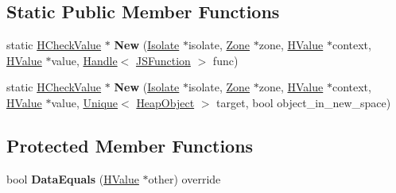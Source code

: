 \subsection*{Static Public Member Functions}
\begin{DoxyCompactItemize}
\item 
static \hyperlink{classv8_1_1internal_1_1_h_check_value}{H\+Check\+Value} $\ast$ {\bfseries New} (\hyperlink{classv8_1_1internal_1_1_isolate}{Isolate} $\ast$isolate, \hyperlink{classv8_1_1internal_1_1_zone}{Zone} $\ast$zone, \hyperlink{classv8_1_1internal_1_1_h_value}{H\+Value} $\ast$context, \hyperlink{classv8_1_1internal_1_1_h_value}{H\+Value} $\ast$value, \hyperlink{classv8_1_1internal_1_1_handle}{Handle}$<$ \hyperlink{classv8_1_1internal_1_1_j_s_function}{J\+S\+Function} $>$ func)\hypertarget{classv8_1_1internal_1_1_h_check_value_a55239b82d59f2dee806c773e62ea68b3}{}\label{classv8_1_1internal_1_1_h_check_value_a55239b82d59f2dee806c773e62ea68b3}

\item 
static \hyperlink{classv8_1_1internal_1_1_h_check_value}{H\+Check\+Value} $\ast$ {\bfseries New} (\hyperlink{classv8_1_1internal_1_1_isolate}{Isolate} $\ast$isolate, \hyperlink{classv8_1_1internal_1_1_zone}{Zone} $\ast$zone, \hyperlink{classv8_1_1internal_1_1_h_value}{H\+Value} $\ast$context, \hyperlink{classv8_1_1internal_1_1_h_value}{H\+Value} $\ast$value, \hyperlink{classv8_1_1internal_1_1_unique}{Unique}$<$ \hyperlink{classv8_1_1internal_1_1_heap_object}{Heap\+Object} $>$ target, bool object\+\_\+in\+\_\+new\+\_\+space)\hypertarget{classv8_1_1internal_1_1_h_check_value_a7dbd577190e36b21ffe65d6d009ef89d}{}\label{classv8_1_1internal_1_1_h_check_value_a7dbd577190e36b21ffe65d6d009ef89d}

\end{DoxyCompactItemize}
\subsection*{Protected Member Functions}
\begin{DoxyCompactItemize}
\item 
bool {\bfseries Data\+Equals} (\hyperlink{classv8_1_1internal_1_1_h_value}{H\+Value} $\ast$other) override\hypertarget{classv8_1_1internal_1_1_h_check_value_a8c11a7d9c45bad87d42589cb02a3b5d2}{}\label{classv8_1_1internal_1_1_h_check_value_a8c11a7d9c45bad87d42589cb02a3b5d2}

\end{DoxyCompactItemize}
